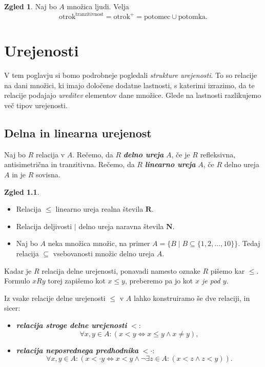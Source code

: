\documentclass[11pt]{book}
\def\NN{\mathbf{N}}
\def\RR{\mathbf{R}}
\def\definicija{\color{rdeca}\bf\em}
\theoremstyle{definition}
\theoremstyle{zgled}
\newtheorem*{zgled}{Zgled}
\theoremstyle{odprtproblem}
\theoremstyle{domacanaloga}
\theoremstyle{izrek}
\begin{document}
\begin{zgled}
Naj bo $A$ množica ljudi. Velja
\[
    \text{otrok}^\text{tranzitivnost} = \text{otrok}^+ = \text{potomec} \cup \text{potomka}.
\]
\end{zgled}

\chapter{Urejenosti}

V tem poglavju si bomo podrobneje pogledali \emph{strukture urejenosti}. To so relacije na dani množici, ki imajo določene dodatne lastnosti, s katerimi izrazimo, da te relacije podajajo \emph{ureditev} elementov dane množice. Glede na lastnosti razlikujemo več tipov urejenosti.

\section{Delna in linearna urejenost}

Naj bo $R$ relacija v $A$. Rečemo, da $R$ {\definicija delno ureja} $A$, če je $R$ refleksivna, antisimetrična in tranzitivna. Rečemo, da $R$ {\definicija linearno ureja} $A$, če $R$ delno ureja $A$ in je $R$ sovisna.

\begin{zgled} \leavevmode
\begin{itemize}
    \item Relacija $\leq$ linearno ureja realna števila $\RR$.
    \item Relacija deljivosti $|$ delno ureja naravna števila $\NN$.
    \item Naj bo $A$ neka množica množic, na primer $A = \{ B \mid B \subseteq \{ 1,2,\dots, 10\} \}$. Tedaj relacija $\subseteq$ vsebovanosti množic delno ureja $A$.
\end{itemize}
\end{zgled}

Kadar je $R$ relacija delne urejenosti, ponavadi namesto oznake $R$ pišemo kar $\leq$. Formulo $x R y$ torej zapišemo kot $x \leq y$, preberemo pa jo kot \emph{$x$ je pod $y$}.

Iz vsake relacije delne urejenosti $\leq$ v $A$ lahko konstruiramo še dve relaciji, in sicer:
\begin{itemize}
    \item {\definicija relacija stroge delne urejenosti} $<$:
    \[
        \forall x, y \in A \colon (x < y \Leftrightarrow x \leq y \land x \neq y),
        \]
    \item {\definicija relacija neposrednega predhodnika} $< \cdot$:
    \[
        \forall x, y \in A \colon \left( x < \cdot y \Leftrightarrow x < y \land \lnot \exists z \in A \colon (x < z \land z < y) \right).
    \]
\end{itemize}
\end{document}
